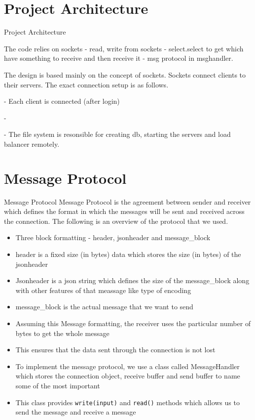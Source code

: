 \documentclass{beamer}
\renewcommand{\t}[1]{\texttt{#1}}
\begin{document}
\section{Project Architecture}
\begin{frame}{Project Architecture}

The code relies on sockets - read, write from sockets - select.select to get which have something to receive and then receive it - msg protocol in msghandler.

The design is based mainly on the concept of sockets. Sockets connect clients to their servers. The exact connection setup is as follows.

- Each client is connected (after login)

- 

- The file system is resonsible for creating db, starting the servers and load balancer remotely.
\end{frame}


\section{Message Protocol}

\begin{frame}{Message Protocol}
Message Protocol is the agreement between sender and receiver which defines the format in which the messages will be sent and received
across the connection. The following is an overview of the protocol that we used.
\begin{itemize}
    \item Three block formatting - header, jsonheader and message\_block
    \item header is a fixed size (in bytes) data which stores the size (in bytes) of the jsonheader
    \item Jsonheader is a json string which defines the size of the message\_block along with other 
    features of that meassage like type of encoding
    \item message\_block is the actual message that we want to send
    \item Assuming this Message formatting, the receiver uses the particular number of bytes to get the whole message
    \item This ensures that the data sent through the connection is not lost
    \item To implement the message protocol, we use a class called MessageHandler which stores the connection object, 
    receive buffer and send buffer to name some of the most important 
    \item This class provides \t{write(input)} and \t{read()} methods which allows us to send the message and receive a message 
\end{itemize}

\end{frame}
\end{document}

